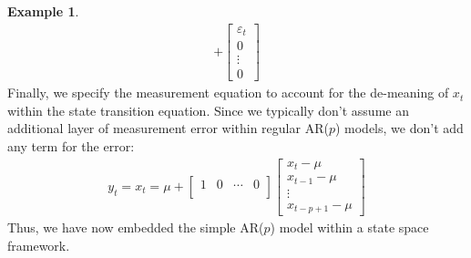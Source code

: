 \documentclass[12pt]{article}
\theoremstyle{plain}
\theoremstyle{definition}
\newtheorem{ex}[thm]{Example}
\theoremstyle{remark}
\begin{document}
\begin{ex}
\begin{align*}
  + \begin{bmatrix} \varepsilon_t \\ 0 \\ \vdots \\ 0
  \end{bmatrix}
\end{align*}
Finally, we specify the measurement equation to account for the
de-meaning of $x_t$ within the state transition equation. Since we
typically don't assume an additional layer of measurement error within
regular AR($p$) models, we don't add any term for the error:
\begin{align*}
  y_t = x_t
  = \mu +
  \begin{bmatrix}
  1 & 0 & \cdots & 0 \\
  \end{bmatrix}
  \begin{bmatrix} x_t - \mu \\ x_{t-1} - \mu \\ \vdots \\
    x_{t-p+1} - \mu \end{bmatrix}
\end{align*}
Thus, we have now embedded the simple AR($p$) model within a state space
framework.
\end{ex}
\end{document}
